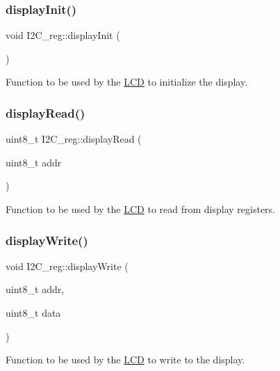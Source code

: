 \subsubsection{\texorpdfstring{display\+Init()}{displayInit()}}
{\footnotesize\ttfamily void I2\+C\+\_\+reg\+::display\+Init (\begin{DoxyParamCaption}{ }\end{DoxyParamCaption})}



Function to be used by the \hyperlink{class_l_c_d}{L\+CD} to initialize the display. 

\mbox{\label{class_i2_c__reg_a09a60c49f946406d98754966473110a5}} 
\subsubsection{\texorpdfstring{display\+Read()}{displayRead()}}
{\footnotesize\ttfamily uint8\+\_\+t I2\+C\+\_\+reg\+::display\+Read (\begin{DoxyParamCaption}\item[{uint8\+\_\+t}]{addr }\end{DoxyParamCaption})}



Function to be used by the \hyperlink{class_l_c_d}{L\+CD} to read from display registers. 

\mbox{\label{class_i2_c__reg_ad9bdd59728a4323f871d0790044e7ac0}} 
\subsubsection{\texorpdfstring{display\+Write()}{displayWrite()}}
{\footnotesize\ttfamily void I2\+C\+\_\+reg\+::display\+Write (\begin{DoxyParamCaption}\item[{uint8\+\_\+t}]{addr,  }\item[{uint8\+\_\+t}]{data }\end{DoxyParamCaption})}



Function to be used by the \hyperlink{class_l_c_d}{L\+CD} to write to the display. 

